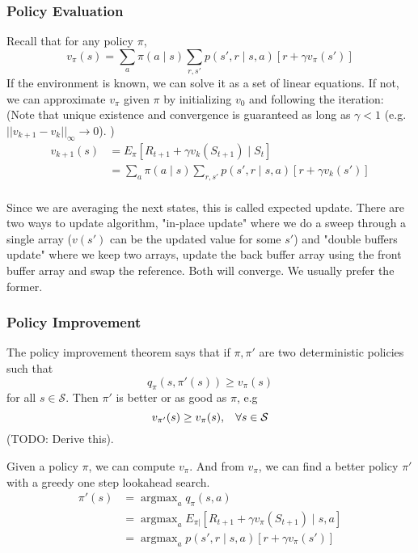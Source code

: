 \documentclass[twocolumn, 10pt]{article}
\DeclareMathOperator*{\argmax}{argmax}
\newcommand{\stateset}{\mathcal{S}}
\begin{document}
 \subsubsection*{Policy Evaluation}
 Recall that for any policy $\pi$,  $$v_{\pi} (s)  = \sum_{a} \pi(a \mid s)  \sum_{r, s'}   p(s', r \mid s, a)   \left[ r  + \gamma v_{\pi}(s')  \right]$$
 If the environment is known, we can solve it as a set of linear equations. If not, we can approximate $v_{\pi}$ given $\pi$ by initializing $v_0$ and following the iteration: (Note that unique existence and convergence is guaranteed as long as $\gamma < 1$ (e.g.  $||v_{k+1} - v_k||_\infty \rightarrow 0$). )
 $$ \begin{aligned}
  v_{k+1} (s)  &= E_{\pi} [R_{t+1} + \gamma v_k(S_{t+1}) \mid S_t]  \\
                       &=  \sum_{a} \pi(a \mid s)  \sum_{r, s'}   p(s', r \mid s, a)   \left[ r  + \gamma v_{k}(s')  \right] \\
 \end{aligned}$$
  
  Since we are averaging the next states, this is called expected update. There are two ways to update algorithm, "in-place update" where we do a sweep through a single array ($v(s')$ can be the updated value for some $s'$) and "double buffers update" where we keep two arrays, update the back buffer array using the front buffer array and swap the reference. Both will converge. We usually prefer the former.
  
 \subsubsection*{Policy Improvement}
The policy improvement theorem says that if $\pi,  \pi'$ are two deterministic policies such that $$q_{\pi} (s, \pi'(s))  \geq v_{\pi}(s)$$ for all $s \in \stateset$. Then $\pi'$ is better or as good as $\pi$, e.g $$ v_{\pi'}(s) \geq v_{\pi}(s), \hspace{2ex} \forall s \in \stateset$$ (TODO: Derive this).

Given a policy $\pi$, we can compute $v_{\pi}$. And from $v_{\pi}$,  we can find a better policy $\pi'$ with a greedy one step lookahead search. 
$$  
\begin{aligned}
\pi'(s)  &= \argmax_{a} q_{\pi}(s, a) \\
			&= \argmax_{a} E_{\pi|} [ R_{t+ 1} + \gamma v_{\pi} (S_{t+1}) \mid  s, a] \\
			&= \argmax_{a} p(s', r \mid s , a) [r + \gamma v_{\pi}(s')]
\end{aligned}
$$
\end{document}
